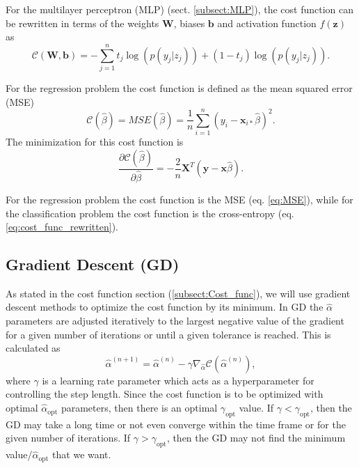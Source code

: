 \documentclass[12pt,a4paper,english]{article}
\begin{document}
For the multilayer perceptron (MLP) (sect. \ref{subsect:MLP}), the cost function can be rewritten in terms of the weights $\textbf{W}$, biases $\textbf{b}$ and activation function $f(\textbf{z})$ as
\begin{equation}
\label{eq:cost_MLP}
\mathcal{C}(\textbf{W},\textbf{b})=-\sum_{j=1}^{n}t_j\log(p(y_j|z_j))+(1-t_j)\log(p(y_j|z_j)).
\end{equation}

For the regression problem the cost function is defined as the mean squared error (MSE)
\begin{equation}
\label{eq:MSE}
\mathcal{C}(\hat{\beta})=MSE(\hat{\beta})=\frac{1}{n}\sum_{i=1}^{n}(y_i-\textbf{x}_{i*}\hat{\beta})^2.
\end{equation}
The minimization for this cost function is
\begin{equation}
\label{eq:MSE_deriv}
\frac{\partial \mathcal{C}(\hat{\beta})}{\partial \hat{\beta}}=-\frac{2}{n}\textbf{X}^T(\textbf{y}-\textbf{x}\hat{\beta}).
\end{equation}

For the regression problem the cost function is the MSE (eq. \ref{eq:MSE}), while for the classification problem the cost function is the cross-entropy (eq. \ref{eq:cost_func_rewritten}).

\subsection{Gradient Descent (GD)}
\label{sect:GD}
As stated in the cost function section (\ref{subsect:Cost_func}), we will use gradient descent methods to optimize the cost function by its minimum. In GD the $\hat{\alpha}$ parameters are adjusted iteratively to the largest negative value of the gradient for a given number of iterations or until a given tolerance is reached. This is calculated as
\begin{equation}
\label{eq:GD_general}
\hat{\alpha}^{(n+1)}=\hat{\alpha}^{(n)}-\gamma\nabla_{\hat{\alpha}} \mathcal{C}(\hat{\alpha}^{(n)}),
\end{equation}
where $\gamma$ is a learning rate parameter which acts as a hyperparameter for controlling the step length. Since the cost function is to be optimized with optimal $\hat{\alpha}_{\text{opt}}$ parameters, then there is an optimal $\gamma_{\text{opt}}$ value. If $\gamma<\gamma_{\text{opt}}$, then the GD may take a long time or not even converge within the time frame or for the given number of iterations. If $\gamma>\gamma_{\text{opt}}$, then the GD may not find the minimum value/$\hat{\alpha}_{\text{opt}}$ that we want.
\end{document}

